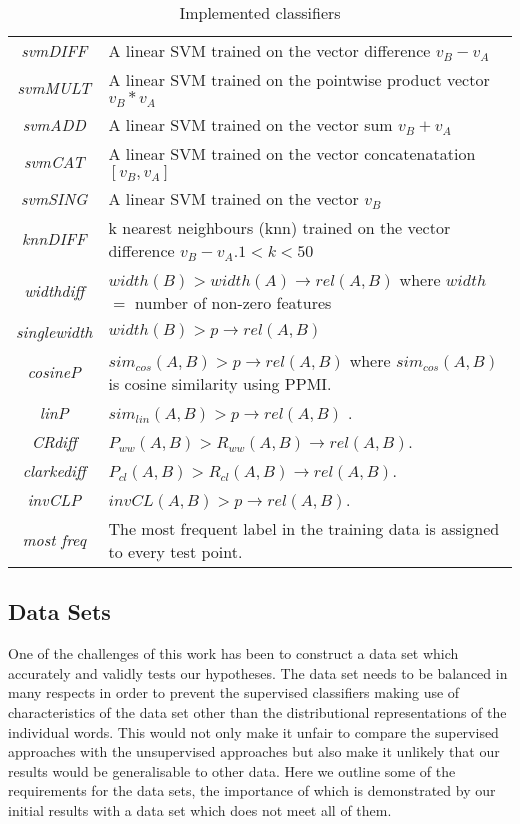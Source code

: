 \documentclass[11pt]{article}
\begin{document}
\begin{table*}[ht]
\centering
\begin{tabular}{|c|p{14cm}|}
\hline
\emph{svmDIFF}& A linear SVM trained on the vector difference $v_B - v_A$\\
\emph{svmMULT}& A linear SVM trained on the pointwise product vector $v_B * v_A$\\
\emph{svmADD}& A linear SVM trained on the vector sum $v_B + v_A$\\
\emph{svmCAT}& A linear SVM trained on the vector concatenatation $[v_B,v_A]$\\
\emph{svmSING}& A linear SVM trained on the vector $v_B$\\
\emph{knnDIFF}& k nearest neighbours (knn) trained on the vector difference $v_B - v_A$.$1< k<50$\\
\hline
\emph{widthdiff}& $width(B) > width(A) \rightarrow rel(A,B)$  where $width$ $=$ number of non-zero features\\
\emph{singlewidth}& $width(B) > p \rightarrow rel(A,B)$\\
\emph{cosineP}& $sim_{cos}(A,B) > p \rightarrow rel(A,B)$ where $sim_{cos}(A,B)$ is cosine similarity using PPMI.\\
\emph{linP}&$sim_{lin}(A,B) > p \rightarrow rel(A,B)$ \cite{Lin1998}.\\
\emph{CRdiff}& $P_{ww}(A,B) > R_{ww}(A,B) \rightarrow rel(A,B)$.  \cite{Weeds2004}\\
\emph{clarkediff}&$P_{cl}(A,B) > R_{cl}(A,B) \rightarrow rel(A,B)$.  \cite{Clarke:09}\\
\emph{invCLP}&$ invCL(A,B) > p \rightarrow rel(A,B)$.  \cite{Lenci2012}\\
\emph{most freq}&The most frequent label in the training data is assigned to every test point.\\
\hline
\end{tabular}
\caption{Implemented classifiers}
\label{table:classifiers}
\end{table*}

\subsection{Data Sets}

One of the challenges of this work has been to construct a data set which accurately and validly tests our hypotheses.  The data set needs to be balanced in many respects in order to prevent the supervised classifiers making use of characteristics of the data set other than the distributional representations of the individual words.  This would not only make it unfair to compare the supervised approaches with the unsupervised approaches but also make it unlikely that our results would be generalisable to other data.  Here we outline some of the requirements for the data sets, the importance of which is demonstrated by our initial results with a data set which does not meet all of them.
\end{document}
